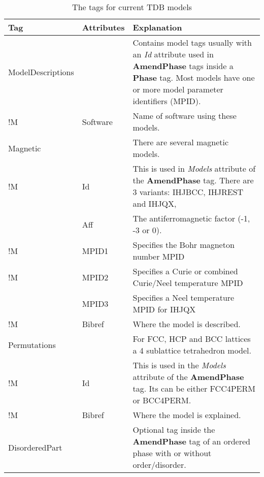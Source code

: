 \documentclass[10pt]{article}
\begin{document}

\begin{table}[!h]
  \caption{The tags for current TDB models}\label{sc:models1}
\begin{tabular}{|p{} p{} p{}|}\hline
  Tag & Attributes & Explanation\\\hline

  ModelDescriptions & & Contains model tags usually with an {\em Id}
           attribute used in {\bf AmendPhase} tags inside a {\bf Phase} tag.
           Most models have one or more model parameter identifiers (MPID).\\
!M       & Software & Name of software using these models.  \\\hline

  Magnetic & & There are several magnetic models. \\
!M      & Id & This is used in {\em Models} attribute of the 
               {\bf AmendPhase} tag.  There are 3 variants:
               IHJBCC, IHJREST and IHJQX,\\
      & Aff   & The antiferromagnetic factor (-1, -3 or 0).\\

!M      & MPID1 & Specifies the Bohr magneton number MPID \\
!M      & MPID2 & Specifies a Curie or combined Curie/Neel temperature MPID\\
        & MPID3 & Specifies a Neel temperature MPID for IHJQX\\
!M      & Bibref & Where the model is described.\\\hline

 Permutations & & For FCC, HCP and BCC lattices a 4 sublattice tetrahedron
                     model. \\
!M     & Id & This is used in the {\em Models} attribute of the
                {\bf AmendPhase} tag.  Its can be either FCC4PERM or BCC4PERM.\\
!M     & Bibref & Where the model is explained.\\\hline

DisorderedPart & & Optional tag inside the {\bf AmendPhase} tag of an 
              ordered phase with or without order/disorder. \\


\end{tabular}
\end{table}
\end{document}
